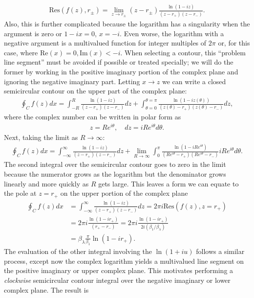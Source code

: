 \begin{align}
  \textrm{Res}( f(z), r_\pm ) = \lim_{z \rightarrow r_\pm } ( z - r_\pm )  \frac{\ln( 1 - iz)}{(z - r_+)(z - r_-)} .
\end{align}
Also, this is further complicated because the logarithm has a singularity when the argument is zero or $1 - ix = 0$, $x = -i$. Even worse, the logarithm with a negative argument is a multivalued function for integer multiples of $2\pi$ or, for this case, where $\textrm{Re}(x) = 0, \textrm{Im}(x) < -i$. When selecting a contour, this ``problem line segment'' must be avoided if possible or treated specially; we will do the former by working in the positive imaginary portion of the complex plane and ignoring the negative imaginary part. Letting $x \rightarrow z$ we can write a closed semicircular contour on the upper part of the complex plane:
\begin{align}
  \oint_C f(z) dx = \int_{-R}^R \frac{\ln( 1 - iz)}{( z - r_+)(z - r_-)} dz + \int_{\theta = 0}^{\theta = \pi} \frac{\ln( 1 - iz(\theta))}{( z(\theta) - r_+)( z(\theta) - r_-)} dz,
\end{align}
where the complex number can be written in polar form as
\begin{align}
  z = R e^{i\theta}, \quad dz = iR e^{i\theta} d\theta. \nonumber
\end{align}
Next, taking the limit as $R \rightarrow \infty$:
\begin{align}
  \oint_C f(z) dx = \int_{-\infty}^\infty \frac{\ln( 1 - iz)}{( z - r_+)(z - r_-)} dz
  + \lim_{R \rightarrow \infty} \int_{0}^{\pi} \frac{\ln( 1 - iR e^{i\theta})}{(R e^{i\theta} - r_+)(R e^{i\theta} - r_- )} iR e^{i\theta} d\theta .
\end{align}
The second integral over the semicircular contour goes to zero in the limit because the numerator grows as the logarithm but the denominator grows linearly and more quickly as $R$ gets large. This leaves a form we can equate to the pole at $z = r_+$ on the upper portion of the complex plane
\begin{align}
  \oint_C f(z) dx &= \int_{-\infty}^\infty \frac{\ln( 1 - iz)}{( z - r_+)(z - r_-)} dz 
  = 2 \pi i \textrm{Res}( f(z), z = r_+ ) \nonumber \\
  &= 2 \pi i \frac{ \ln( 1 - i r_+ ) }{(r_+ - r_-)} = 2 \pi i \frac{ \ln( 1 - i r_+ ) }{2 i (\beta_1 / \beta_\lambda)} \nonumber \\
  &= \beta_\lambda \frac{\pi}{\beta_1} \ln( 1 - i r_+ ) .
\end{align}
The evaluation of the other integral involving the $\ln(1 + iu)$ follows a similar process, except now the complex logarithm yields a multivalued line segment on the positive imaginary or upper complex plane. This motivates performing a \emph{clockwise} semicircular contour integral over the negative imaginary or lower complex plane. The result is

